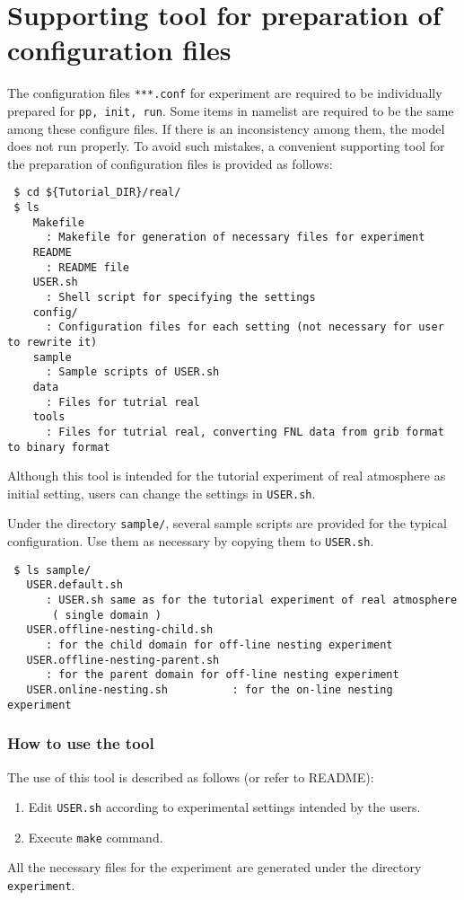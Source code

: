 \section{Supporting tool for preparation of configuration files} \label{sec:basic_makeconf}

The configuration files \verb|***.conf| for experiment are required to be individually prepared for \verb|pp, init, run|. Some items in namelist are required to be the same among these configure files. If there is an inconsistency among them, the model does not run properly. To avoid such mistakes, a convenient supporting tool for the preparation of configuration files is provided as follows:
\begin{verbatim}
 $ cd ${Tutorial_DIR}/real/
 $ ls
    Makefile 
      : Makefile for generation of necessary files for experiment
    README
      : README file
    USER.sh
      : Shell script for specifying the settings
    config/  
      : Configuration files for each setting (not necessary for user to rewrite it)
    sample
      : Sample scripts of USER.sh
    data
      : Files for tutrial real
    tools
      : Files for tutrial real, converting FNL data from grib format to binary format
\end{verbatim}
Although this tool is intended for the tutorial experiment of real atmosphere as initial setting, users can change the settings in \verb|USER.sh|.

Under the directory \verb|sample/|, several sample scripts are provided for the typical configuration. Use them as necessary by copying them to \verb|USER.sh|.
\begin{verbatim}
 $ ls sample/
   USER.default.sh                 
      : USER.sh same as for the tutorial experiment of real atmosphere
       ( single domain )
   USER.offline-nesting-child.sh   
      : for the child domain for off-line nesting experiment
   USER.offline-nesting-parent.sh  
      : for the parent domain for off-line nesting experiment
   USER.online-nesting.sh          : for the on-line nesting experiment
\end{verbatim}


\subsubsection{How to use the tool}

The use of this tool is described as follows (or refer to README):
\begin{enumerate}
  \item Edit \verb|USER.sh| according to experimental settings intended by the users.
  \item Execute \verb|make| command.
\end{enumerate}
 All the necessary files for the experiment are generated under the directory \verb|experiment|.

